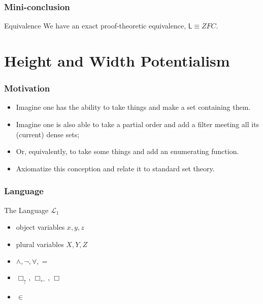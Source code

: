 \documentclass{beamer}
\newcommand{\bu}{\Box_\uparrow}
\newcommand{\bl}{\Box_\leftarrow}
\begin{document}
\begin{frame}
    \frametitle{Mini-conclusion}
\begin{block}{Equivalence}
    We have an exact proof-theoretic equivalence, $\mathsf{L} \equiv ZFC$.
\end{block}
\end{frame}

\section{Height and Width Potentialism}
\begin{frame}
    \frametitle{Motivation}
    \begin{itemize}
        \item<2->   Imagine one has the ability to take things and 
                    make a set containing them.
        \item<3->   Imagine one is also able to take a partial order and add a filter 
                    meeting all its (current) dense sets; 
        \item<4->   Or, equivalently, to take some things and add an enumerating function.
        \item<5->   Axiomatize this conception and relate it to standard set theory.
    \end{itemize}
\end{frame}
\begin{frame}
    \frametitle{Language}
    \begin{block}{The Language $\mathcal{L}_1$}
        \begin{itemize}
            \item object variables $x, y, z$
            \item<2-> plural variables $X, Y, Z$
            \item<3-> $\wedge, \neg, \forall, =$
            \item<4-> $\bu$, $\bl$, $\Box$
            \item<5-> $\in$
        \end{itemize} 
    \end{block}
\end{frame}
\end{document}
